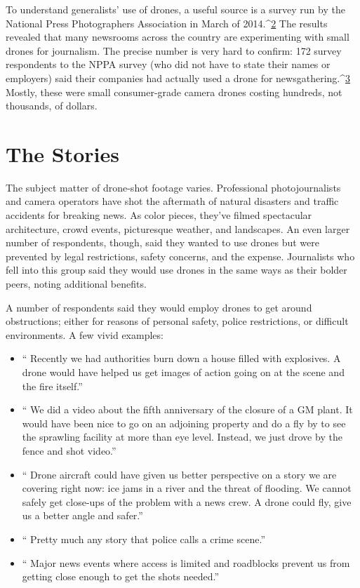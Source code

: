 To understand generalists' use of drones, a useful source is a survey run by
the National Press Photographers Association in March of 2014.^{\href{#endnotes-industry-overview}{2}} The results
revealed that many newsrooms across the country are experimenting with
small drones for journalism. The precise number is very hard to confirm:
172 survey respondents to the NPPA survey (who did not have to state their names or employers) said their companies had actually used a drone for
newsgathering.^{\href{#endnotes-industry-overview}{3}} Mostly, these were small consumer-grade camera drones
costing hundreds, not thousands, of dollars.

\section{The Stories}
The subject matter of drone-shot footage varies. Professional photojournalists
and camera operators have shot the aftermath of natural disasters and
traffic accidents for breaking news. As color pieces, they've filmed spectacular
architecture, crowd events, picturesque weather, and landscapes.
An even larger number of respondents, though, said they wanted to use
drones but were prevented by legal restrictions, safety concerns, and the
expense. Journalists who fell into this group said they would use drones in
the same ways as their bolder peers, noting additional benefits.

A number of respondents said they would employ drones to get around
obstructions; either for reasons of personal safety, police restrictions, or difficult
environments. A few vivid examples:
\begin{itemize}
\item `` Recently we had authorities burn down a house filled with
explosives. A drone would have helped us get images of action
going on at the scene and the fire itself.''
\item `` We did a video about the fifth anniversary of the closure of a
GM plant. It would have been nice to go on an adjoining property
and do a fly by to see the sprawling facility at more than eye
level. Instead, we just drove by the fence and shot video.''
\item `` Drone aircraft could have given us better perspective on a story
we are covering right now: ice jams in a river and the threat of
flooding. We cannot safely get close-ups of the problem with a
news crew. A drone could fly, give us a better angle and safer.''
\item `` Pretty much any story that police calls a crime scene.''
\item `` Major news events where access is limited and roadblocks prevent
us from getting close enough to get the shots needed.''
\end{itemize}

